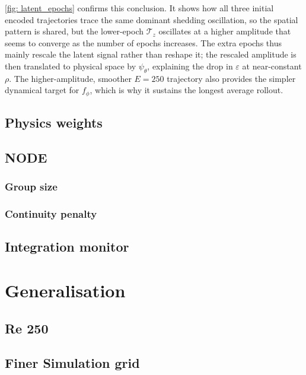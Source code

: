 \autoref{fig: latent_epochs} confirms this conclusion. It shows how all three initial encoded trajectories trace the same dominant shedding oscillation, so the spatial pattern is shared, but the lower-epoch $\mathcal{T}_z$ oscillates at a higher amplitude that seems to converge as the number of epochs increases. The extra epochs thus mainly rescale the latent signal rather than reshape it; the rescaled amplitude is then translated to physical space by $\psi_\theta$, explaining the drop in $\varepsilon$ at near-constant $\rho$. The higher-amplitude, smoother $E = 250$ trajectory also provides the simpler dynamical target for $f_\phi$, which is why it sustains the longest average rollout.

\subsection{Physics weights}


\subsection{NODE}
\label{subsect: 4_node_params}

\subsubsection{Group size}
\subsubsection{Continuity penalty}

\subsection{Integration monitor}

\section{Generalisation}

\subsection{Re 250}

\subsection{Finer Simulation grid}



